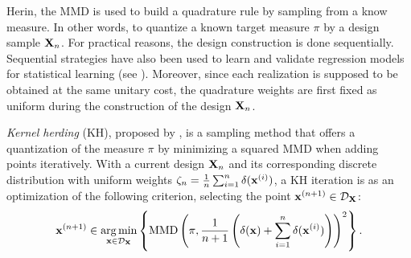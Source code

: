 Herin, the MMD is used to build a quadrature rule by sampling from a know measure. 
In other words, to quantize a known target measure $\pi$ by a design sample ${\bf X}_n$. 
For practical reasons, the design construction is done sequentially. 
Sequential strategies have also been used to learn and validate regression models for statistical learning (see \cite{fekhari_iooss_2023}). 
Moreover, since each realization is supposed to be obtained at the same unitary cost, the quadrature weights are first fixed as uniform during the construction of the design ${\bf X}_n$.

\emph{Kernel herding} (KH), proposed by \cite{chen_welling_2010}, is a sampling method that offers a quantization of the measure $\pi$ by minimizing a squared MMD when adding points iteratively. 
With a current design ${\bf X}_n$ and its corresponding discrete distribution with uniform weights $\zeta_n= \frac{1}{n} \sum_{i=1}^{n} \delta({\bf x}^{(i)})$, a KH iteration is as an optimization of the following criterion, selecting the point ${\bf x}^{(n+1)} \in \mathcal{D}_{{\bf X}}$:
\begin{align}
   {\bf x}^{(n+1)} \in \operatorname*{arg\,min}_{{\bf x} \in \mathcal{D}_{{\bf X}}} \left\{\mathrm{MMD}\left(\pi, \frac{1}{n+1} \left(\delta({\bf x}) + \sum_{i=1}^{n} \delta({\bf x}^{(i)})\right)\right)^2\right\}.
   \label{eq:mmd_criterion}
\end{align}

